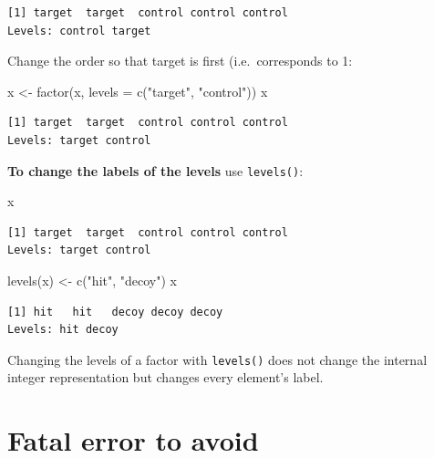 \documentclass[
]{book}
\newenvironment{Shaded}{\begin{snugshade}}{\end{snugshade}}
\newcommand{\AttributeTok}[1]{\textcolor[rgb]{0.77,0.63,0.00}{#1}}
\newcommand{\FunctionTok}[1]{\textcolor[rgb]{0.00,0.00,0.00}{#1}}
\newcommand{\NormalTok}[1]{#1}
\newcommand{\OtherTok}[1]{\textcolor[rgb]{0.56,0.35,0.01}{#1}}
\newcommand{\StringTok}[1]{\textcolor[rgb]{0.31,0.60,0.02}{#1}}
\begin{document}
\begin{verbatim}
[1] target  target  control control control
Levels: control target
\end{verbatim}

Change the order so that target is first (i.e.~corresponds to 1:

\begin{Shaded}
\begin{Highlighting}[]
\NormalTok{x }\OtherTok{\textless{}{-}} \FunctionTok{factor}\NormalTok{(x, }\AttributeTok{levels =} \FunctionTok{c}\NormalTok{(}\StringTok{"target"}\NormalTok{, }\StringTok{"control"}\NormalTok{))}
\NormalTok{x}
\end{Highlighting}
\end{Shaded}

\begin{verbatim}
[1] target  target  control control control
Levels: target control
\end{verbatim}

\textbf{To change the labels of the levels} use \texttt{levels()}:

\begin{Shaded}
\begin{Highlighting}[]
\NormalTok{x}
\end{Highlighting}
\end{Shaded}

\begin{verbatim}
[1] target  target  control control control
Levels: target control
\end{verbatim}

\begin{Shaded}
\begin{Highlighting}[]
\FunctionTok{levels}\NormalTok{(x) }\OtherTok{\textless{}{-}} \FunctionTok{c}\NormalTok{(}\StringTok{"hit"}\NormalTok{, }\StringTok{"decoy"}\NormalTok{)}
\NormalTok{x}
\end{Highlighting}
\end{Shaded}

\begin{verbatim}
[1] hit   hit   decoy decoy decoy
Levels: hit decoy
\end{verbatim}

\begin{rmdcaution}
Changing the levels of a factor with \texttt{levels()} does not change
the internal integer representation but changes every element's label.
\end{rmdcaution}

\hypertarget{fatal-error-to-avoid}{%
\section{Fatal error to avoid}\label{fatal-error-to-avoid}}
\end{document}
